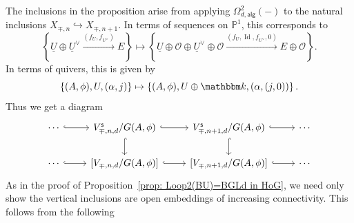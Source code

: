 \documentclass{amsart}
\theoremstyle{definition}
\newcommand{\kk} {{\mathbbm k}}
\newcommand{\PP}{\mathbb{P}}
\newcommand{\OO}{\mathcal{O}}
\newcommand{\UL}[1]{\underline{#1}}
\newcommand{\alg}{\mathsf{alg}}
\newcommand{\stable}{\mathsf{s}}
\newcommand{\LoopTwo}{\Omega^{2}_{d,\alg}}
\newcommand{\Id}{\operatorname{Id}}
\begin{document}
The inclusions in the proposition arise from applying $\LoopTwo (-)$
to the natural inclusions $X_{\mp ,n}\hookrightarrow X_{\mp ,n+1}$. In
terms of sequences on $\PP^{1}$, this corresponds to 
\[
\left\{\UL{U}\oplus \UL{U}^{\vee}\xrightarrow{(f_{U},f_{U^{\vee}})}E
\right\} \mapsto \left\{\UL{U}\oplus \OO \oplus \UL{U}^{\vee}\oplus
\OO  \xrightarrow{(f_{U},\Id ,f_{U^{\vee}},0)}E\oplus \OO  \right\}.
\]
In terms of quivers, this is given by
\[
\left\{(A,\phi ),U,(\alpha ,j) \right\}\mapsto \left\{(A,\phi
),U\oplus \kk ,(\alpha ,(j,0)) \right\}.
\]
Thus we get a diagram
\begin{equation}\label{diag: diagram defining Loop(X+infty) in HoG}
\begin{tikzcd}
    \cdots \arrow[r, hook]
    & V^{\stable}_{\mp ,n,d}/G(A,\phi ) \arrow[r, hook] \arrow[d, hook]
    & V^{\stable}_{\mp ,n+1,d}/G(A,\phi )  \arrow[r, hook] \arrow[d, hook] & \cdots \\
    \cdots \arrow[r, hook]
    & \left[V_{\mp ,n,d}/G(A,\phi ) \right] \arrow[r, hook]
    & \left[V_{\mp, n+1,d}/G(A,\phi ) \right] 
\arrow[r, hook] & \cdots
\end{tikzcd}
\end{equation}
As in the proof of Proposition~\ref{prop: Loop2(BU)=BGLd in HoG}, we
need only show the vertical inclusions are open embeddings of
increasing connectivity. This follows from the following
\end{document}
